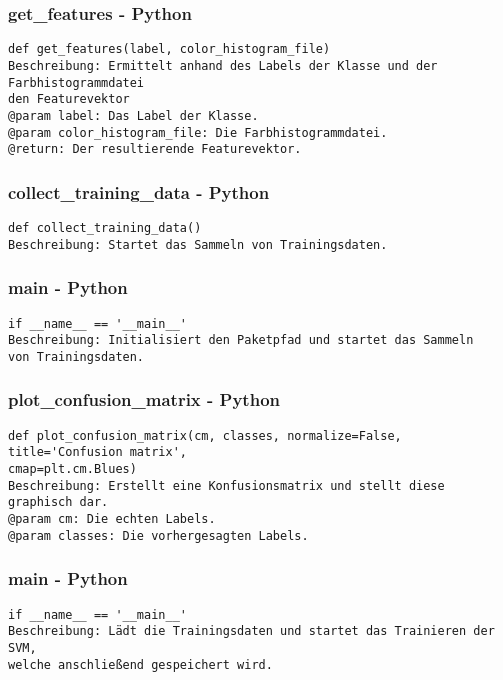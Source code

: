 \documentclass{suturo}
\begin{document}
\subsubsection{get\_features - Python}
\begin{verbatim}
def get_features(label, color_histogram_file)
Beschreibung: Ermittelt anhand des Labels der Klasse und der Farbhistogrammdatei 
den Featurevektor
@param label: Das Label der Klasse.
@param color_histogram_file: Die Farbhistogrammdatei.
@return: Der resultierende Featurevektor.
\end{verbatim}

\subsubsection{collect\_training\_data - Python}
\begin{verbatim}
def collect_training_data()
Beschreibung: Startet das Sammeln von Trainingsdaten.
\end{verbatim}

\subsubsection{main - Python}
\begin{verbatim}
if __name__ == '__main__'
Beschreibung: Initialisiert den Paketpfad und startet das Sammeln 
von Trainingsdaten.
\end{verbatim}

\subsubsection{plot\_confusion\_matrix - Python}
\begin{verbatim}
def plot_confusion_matrix(cm, classes, normalize=False, title='Confusion matrix',
cmap=plt.cm.Blues)
Beschreibung: Erstellt eine Konfusionsmatrix und stellt diese graphisch dar. 
@param cm: Die echten Labels.
@param classes: Die vorhergesagten Labels.
\end{verbatim}

\subsubsection{main - Python}
\begin{verbatim}
if __name__ == '__main__'
Beschreibung: Lädt die Trainingsdaten und startet das Trainieren der SVM, 
welche anschließend gespeichert wird.
\end{verbatim}
\end{document}
